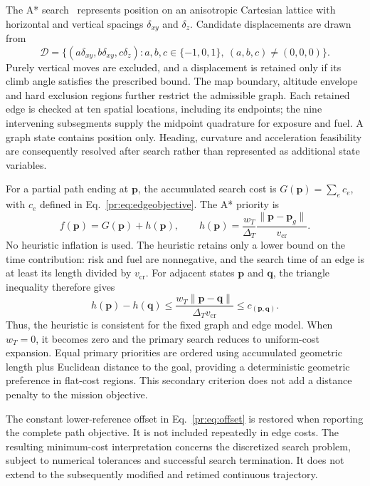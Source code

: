 The A* search~\cite{hart1968} represents position on an anisotropic Cartesian lattice
with horizontal and vertical spacings $\delta_{xy}$ and $\delta_z$.
Candidate displacements are drawn from
\begin{equation}
 \mathcal{D}=\{(a\delta_{xy},b\delta_{xy},c\delta_z):
 a,b,c\in\{-1,0,1\},\ (a,b,c)\ne(0,0,0)\}.
 \label{me:eq:neighbors}
\end{equation}
Purely vertical moves are excluded, and a displacement is retained only
if its climb angle satisfies the prescribed bound. The map boundary,
altitude envelope and hard exclusion regions further restrict the
admissible graph. Each retained edge is checked at ten spatial locations,
including its endpoints; the nine intervening subsegments supply the
midpoint quadrature for exposure and fuel. A graph state contains position
only. Heading, curvature and acceleration feasibility are consequently
resolved after search rather than represented as additional state variables.

For a partial path ending at $\mathbf p$, the accumulated search cost is
$G(\mathbf p)=\sum_e c_e$, with $c_e$ defined in
Eq.~\eqref{pr:eq:edgeobjective}. The A* priority is
\begin{equation}
 f(\mathbf p)=G(\mathbf p)+h(\mathbf p),\qquad
 h(\mathbf p)=\frac{w_T}{\Delta_T}
              \frac{\|\mathbf p-\mathbf p_g\|}{v_{\mathrm{cr}}}.
 \label{me:eq:heuristic}
\end{equation}
No heuristic inflation is used. The heuristic retains only a lower bound
on the time contribution: risk and fuel are nonnegative, and the search
time of an edge is at least its length divided by $v_{\mathrm{cr}}$.
For adjacent states $\mathbf p$ and $\mathbf q$, the triangle inequality
therefore gives
\begin{equation}
 h(\mathbf p)-h(\mathbf q)
 \le \frac{w_T\|\mathbf p-\mathbf q\|}{\Delta_Tv_{\mathrm{cr}}}
 \le c_{(\mathbf p,\mathbf q)}.
 \label{me:eq:consistency}
\end{equation}
Thus, the heuristic is consistent for the fixed graph and edge model.
When $w_T=0$, it becomes zero and the primary search reduces to uniform-cost
expansion. Equal primary priorities are ordered using accumulated geometric
length plus Euclidean distance to the goal, providing a deterministic
geometric preference in flat-cost regions. This secondary criterion does
not add a distance penalty to the mission objective.

The constant lower-reference offset in Eq.~\eqref{pr:eq:offset} is restored
when reporting the complete path objective. It is not included repeatedly
in edge costs. The resulting minimum-cost interpretation concerns the
discretized search problem, subject to numerical tolerances and successful
search termination. It does not extend to the subsequently modified and
retimed continuous trajectory.

